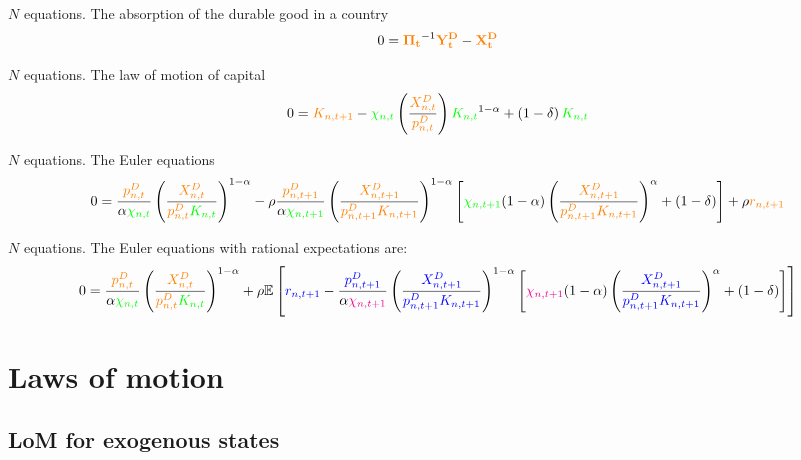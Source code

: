 \documentclass[11pt]{article}
\newcommand{\cl}[1]{{\color{orange}{#1}}}
\newcommand{\st}[1]{{\color{green}{#1}}}
\newcommand{\stnext}[1]{{\color{magenta}{#1}}}
\newcommand{\clnext}[1]{{\color{blue}{#1}}}
\begin{document}
\noindent $N$ equations. The absorption of the durable good in a country 
\begin{equation}
0 = \mathbf{\cl{\Pi_t}}^{-1} \mathbf{\cl{Y^D_t}} - \mathbf{\cl{X^D_t}}
\end{equation}

\noindent $N$ equations. The law of motion of capital
\begin{equation}
0 = \cl{K_{n,t+1}} - \st{\chi_{n,t}} \left( \frac{\cl{X_{n,t}^D}}{\cl{p_{n,t}^D}} \right) \st{K_{n,t}}^{1-\alpha} + \left(1 - \delta\right) \st{K_{n,t}}
\end{equation}

\noindent $N$ equations. The Euler equations
\begin{equation}
0 = \frac{\cl{p_{n, t}^{D}}}{\alpha \st{\chi_{n, t}}}\left(\frac{\cl{X_{n, t}^{D}}}{\cl{p_{n, t}^{D}} \st{K_{n, t}}}\right)^{1-\alpha} - \rho \frac{\cl{p_{n, t+1}^{D}}}{\alpha \st{\chi_{n, t+1}}}\left(\frac{\cl{X_{n, t+1}^{D}}}{\cl{p_{n, t+1}^{D}} \cl{K_{n, t+1}}}\right)^{1-\alpha}\left[\st{\chi_{n, t+1}}(1-\alpha)\left(\frac{\cl{X_{n, t+1}^{D}}}{\cl{p_{n, t+1}^{D}} \cl{K_{n, t+1}}}\right)^{\alpha}+(1-\delta)\right]+\rho \cl{r_{n, t+1}}
\end{equation}

\noindent $N$ equations. The Euler equations with rational expectations are:
\begin{equation}
0 = \frac{\cl{p_{n, t}^{D}}}{\alpha \st{\chi_{n, t}}}\left(\frac{\cl{X_{n, t}^{D}}}{\cl{p_{n, t}^{D}} \st{K_{n, t}}}\right)^{1-\alpha} + \rho \mathbb{E}\left[\clnext{r_{n, t+1}} - \frac{\clnext{p_{n, t+1}^{D}}}{\alpha \stnext{\chi_{n, t+1}}}\left(\frac{\clnext{X_{n, t+1}^{D}}}{\clnext{p_{n, t+1}^{D}} \clnext{K_{n, t+1}}}\right)^{1-\alpha}\left[\stnext{\chi_{n, t+1}}(1-\alpha)\left(\frac{\clnext{X_{n, t+1}^{D}}}{\clnext{p_{n, t+1}^{D}} \clnext{K_{n, t+1}}}\right)^{\alpha}+(1-\delta)\right]\right]
\end{equation}


\section{Laws of motion}

\subsection{LoM for exogenous states}
\end{document}
